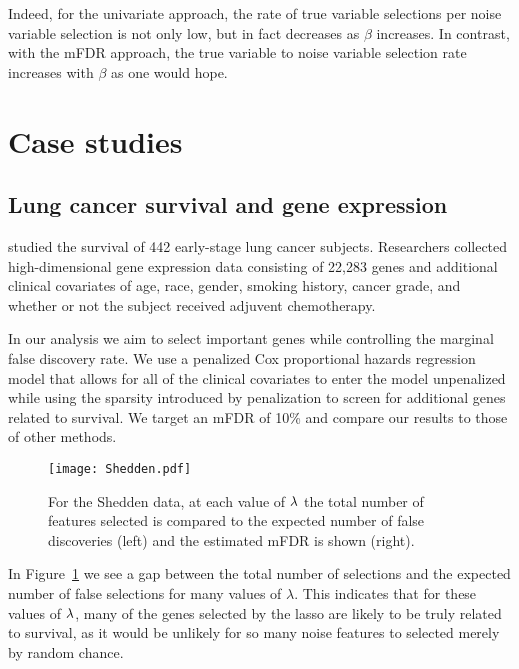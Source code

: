 Indeed, for the univariate approach, the rate of true variable selections per noise variable selection is not only low, but in fact decreases as $\beta$ increases. In contrast, with the mFDR approach, the true variable to noise variable selection rate increases with $\beta$ as one would hope.

\section{Case studies}

\subsection{Lung cancer survival and gene expression}

\citet{Shedden2008} studied the survival of 442 early-stage lung cancer subjects. Researchers collected high-dimensional gene expression data consisting of 22,283 genes and additional clinical covariates of age, race, gender, smoking history, cancer grade, and whether or not the subject received adjuvent chemotherapy.  

In our analysis we aim to select important genes while controlling the marginal false discovery rate.  We use a penalized Cox proportional hazards regression model that allows for all of the clinical covariates to enter the model unpenalized while using the sparsity introduced by penalization to screen for additional genes related to survival.  We target an mFDR of 10\% and compare our results to those of other methods.



\begin{figure} [!htb]
 \centering
  \texttt{[image: Shedden.pdf]}
  \caption{\label{Fig:Shedden} For the Shedden data, at each value of $\lambda$ the total number of features selected is compared to the expected number of false discoveries (left) and the estimated mFDR is shown (right).}
\end{figure}

In Figure~\ref{Fig:Shedden} we see a gap between the total number of selections and the expected number of false selections for many values of $\lambda$.  This indicates that for these values of $\lambda$, many of the genes selected by the lasso are likely to be truly related to survival, as it would be unlikely for so many noise features to selected merely by random chance.

